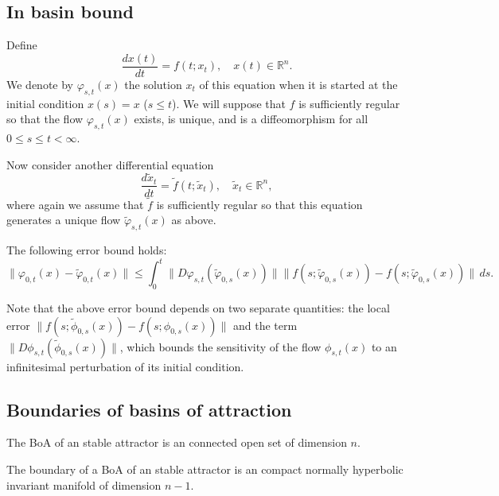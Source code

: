 \documentclass{article}
\newcounter{ct}
\begin{document}
\subsection{In basin bound}\label{sec:313}
\begin{proposition}\label{prop:313}
Define 
\[
\frac{d x(t)}{d t} = f(t; x_t), \quad x(t) \in \mathbb{R}^n.
\]
We denote by $\varphi_{s,t}(x)$ the solution $x_t$ of this equation when it is started at the initial condition $x(s) = x$ ($s \leq t$). We will suppose that $f$ is sufficiently regular so that the flow $\varphi_{s,t}(x)$ exists, is unique, and is a diffeomorphism for all $0 \leq s \leq t < \infty$.

Now consider another differential equation 
\[
\frac{d \tilde{x}_t}{d t} = \tilde{f}(t; \tilde{x}_t), \quad \tilde{x}_t \in \mathbb{R}^n,
\]
where again we assume that $\tilde{f}$ is sufficiently regular so that this equation generates a unique flow $\tilde{\varphi}_{s,t}(x)$ as above.


The following error bound holds:
\[
\|\varphi_{0,t}(x) - \tilde{\varphi}_{0,t}(x)\| \leq \int_0^t \|D\varphi_{s,t}(\tilde{\varphi}_{0,s}(x))\| \|f(s; \tilde{\varphi}_{0,s}(x)) - f(s; \tilde{\varphi}_{0,s}(x))\| \, ds.
\]
\end{proposition}


\begin{remark}\label{rem:313}
Note that the above error bound depends on two separate quantities: 
the local error \( \| f(s; \tilde{\phi}_{0,s}(x)) - f(s; \phi_{0,s}(x)) \| \) 
and 
the term \( \| D\phi_{s,t}(\tilde{\phi}_{0,s}(x)) \| \), which bounds the sensitivity of the flow \( \phi_{s,t}(x) \) to an infinitesimal perturbation of its initial condition.
\end{remark}


\subsection{Boundaries of basins of attraction}\label{sec:boaboundary}

\begin{proposition}
The BoA of an stable attractor is an connected open set of dimension $n$. %
\end{proposition}


\begin{proposition}
The boundary of a BoA of an stable attractor is an compact normally hyperbolic invariant manifold of dimension $n-1$. %
\end{proposition}
\end{document}
